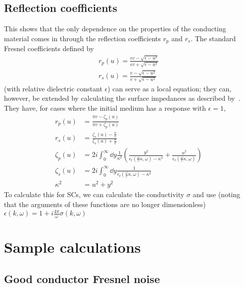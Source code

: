 \documentclass[11pt]{article}
\begin{document}
	\subsection{Reflection coefficients} \label{subsec:ReflectionCoeffs}
	This shows that the only dependence on the properties of the conducting material comes in through the reflection coefficients $r_p$ and $r_s$.
	The standard Fresnel coefficients defined by
	\begin{align}
		r_p(u) = \frac{\epsilon v - \sqrt{\epsilon - u^2}}{\epsilon v + \sqrt{\epsilon - u^2}} \\
		r_s(u) = \frac{v - \sqrt{\epsilon - u^2}}{v + \sqrt{\epsilon - u^2}}
	\end{align}
	(with relative dielectric constant $\epsilon$) can serve as a local equation;
	they can, however, be extended by calculating the surface impedances as described by~\cite{Ford1984}.
	They have, for cases where the initial medium has a response with $\epsilon = 1$,
	\begin{align}
		r_p(u) &= \frac{\pi v - \zeta_p(u)}{\pi v + \zeta_p(u)} \\
		r_s(u) &= \frac{\zeta_s(u) - \frac{\pi}{v}}{\zeta_s(u) + \frac{\pi}{v}} \\
		\zeta_p(u) &= 2i \int_0^\infty \dd{y} \frac{1}{\kappa^2} \left( \frac{y^2}{\epsilon_t(\frac{\omega}{c}\kappa, \omega) - \kappa^2} + \frac{u^2}{\epsilon_\ell(\frac{\omega}{c}\kappa, \omega)} \right) \\
		\zeta_s(u) &= 2i \int_0^\infty \dd{y} \frac{1}{\epsilon_t(\frac{\omega}{c}\kappa, \omega) - \kappa^2} \\
		\kappa^2 &= u^2 + y^2
	\end{align}
	To calculate this for SCs, we can calculate the conductivity $\sigma$ and use (noting that the arguments of these functions are no longer dimensionless) $\epsilon(k, \omega) = 1 + i \frac{4 \pi}{\omega} \sigma(k, \omega)$%

	\section{Sample calculations} \label{sec:SampleCalcs}

	\subsection{Good conductor Fresnel noise} \label{subsec:sample:fresnelperfect}
\end{document}
